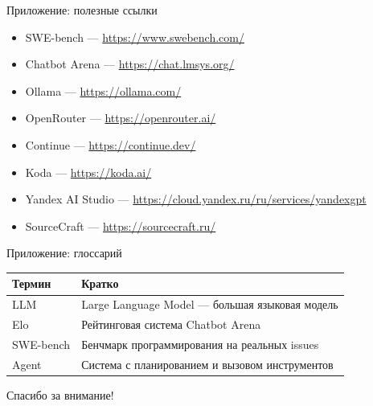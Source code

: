 \documentclass[aspectratio=169,10pt,russian]{beamer}
\begin{document}
\appendix

\begin{frame}{Приложение: полезные ссылки}
  \small
  \begin{itemize}
    \item SWE-bench — \url{https://www.swebench.com/}
    \item Chatbot Arena — \url{https://chat.lmsys.org/}
    \item Ollama — \url{https://ollama.com/}
    \item OpenRouter — \url{https://openrouter.ai/}
    \item Continue — \url{https://continue.dev/}
    \item Koda — \url{https://koda.ai/}
    \item Yandex AI Studio — \url{https://cloud.yandex.ru/ru/services/yandexgpt}
    \item SourceCraft — \url{https://sourcecraft.ru/}
  \end{itemize}
\end{frame}

\begin{frame}{Приложение: глоссарий}
  \footnotesize
  \begin{tabularx}{\linewidth}{@{}l X@{}}
    \toprule
    \textbf{Термин} & \textbf{Кратко} \\
    \midrule
    LLM & Large Language Model — большая языковая модель \\
    Elo & Рейтинговая система Chatbot Arena \\
    SWE-bench & Бенчмарк программирования на реальных issues \\
    Agent & Система с планированием и вызовом инструментов \\
    \bottomrule
  \end{tabularx}
\end{frame}

\begin{frame}[standout]
  \Huge Спасибо за внимание!
\end{frame}
\end{document}
